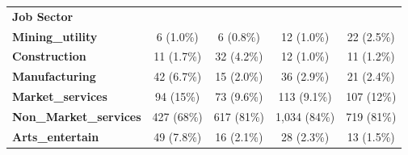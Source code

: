 \begin{table}
{\begin{tabular}[t]{>{}lcccc}
\textbf{Job Sector} &  &  &  & \\
\textbf{Mining\_utility} & 6 (1.0\%) & 6 (0.8\%) & 12 (1.0\%) & 22 (2.5\%)\\
\addlinespace
\textbf{Construction} & 11 (1.7\%) & 32 (4.2\%) & 12 (1.0\%) & 11 (1.2\%)\\
\textbf{Manufacturing} & 42 (6.7\%) & 15 (2.0\%) & 36 (2.9\%) & 21 (2.4\%)\\
\textbf{Market\_services} & 94 (15\%) & 73 (9.6\%) & 113 (9.1\%) & 107 (12\%)\\
\textbf{Non\_Market\_services} & 427 (68\%) & 617 (81\%) & 1,034 (84\%) & 719 (81\%)\\
\textbf{Arts\_entertain} & 49 (7.8\%) & 16 (2.1\%) & 28 (2.3\%) & 13 (1.5\%)\\
\bottomrule
\end{tabular}}
\end{table}
